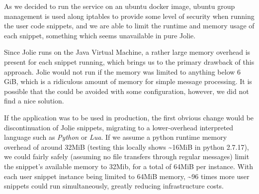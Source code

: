 As we decided to run the service on an ubuntu docker image, ubuntu group management is used along iptables to provide some level of security when running the user code snippets, and we are able to limit the runtime and memory usage of each snippet, something which seems unavailable in pure Jolie.

Since Jolie runs on the Java Virtual Machine, a rather large memory overhead is present for each snippet running, which brings us to the primary drawback of this approach.
Jolie would not run if the memory was limited to anything below 6 GiB, which is a ridiculous amount of memory for simple message processing.
It is possible that the could be avoided with some configuration, however, we did not find a nice solution.

\bigskip

If the application was to be used in production, the first obvious change would be discontinuation of Jolie snippets, migrating to a lower-overhead interpreted language such as \textit{Python} or \textit{Lua}.
If we assume a python runtime memory overhead of around 32MiB (testing this locally shows \textasciitilde 16MiB in python 2.7.17), we could fairly safely (assuming no file transfers through regular messages) limit the snippet's available memory to 32Mib, for a total of 64MiB per instance. 
With each user snippet instance being limited to 64MiB memory, \textasciitilde 96 times more user snippets could run simultaneously, greatly reducing infrastructure costs.
